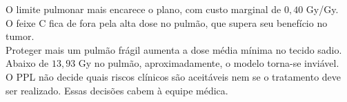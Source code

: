 \documentclass[12pt,a4paper]{article}
\begin{document}
\noindent
O limite pulmonar mais encarece o plano, com custo marginal de $0{,}40$ Gy/Gy.\\
O feixe C fica de fora pela alta dose no pulmão, que supera seu benefício no tumor.\\
Proteger mais um pulmão frágil aumenta a dose média mínima no tecido sadio.\\
Abaixo de $13{,}93$ Gy no pulmão, aproximadamente, o modelo torna-se inviável.\\
O PPL não decide quais riscos clínicos são aceitáveis nem se o tratamento deve\\
ser realizado. Essas decisões cabem à equipe médica.
\end{document}
